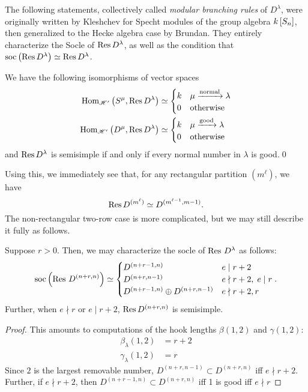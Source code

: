 \documentclass{amsart}
\begin{document}
  The following statements, collectively called \emph{modular branching rules} of $D^\lambda$, were originally written by Kleshchev for Specht modules of the group algebra $k\left[ S_n \right]$, then generalized to the Hecke algebra case by Brundan.\cite{Kleshchev}\cite{Brundan} 
  They entirely characterize the Socle of $\operatorname{Res} D^\lambda$, as well as the condition that $\operatorname{soc}\left( \operatorname{Res} D^\lambda \right) \simeq \operatorname{Res} D^\lambda$.
  \begin{theorem}
    We have the following isomorphisms of vector spaces
    \begin{align*}
      \text{Hom}_{\mathscr{H}'}\left( S^\mu,\operatorname{Res} D^\lambda \right) 
      &\simeq \begin{cases}
        k & \mu \xrightarrow{\text{normal}} \lambda\\
        0 & \text{otherwise}
      \end{cases}\\
      \text{Hom}_{\mathscr{H}'}\left( D^\mu,\operatorname{Res} D^\lambda \right) 
      &\simeq \begin{cases}
        k & \mu \xrightarrow{\text{good}} \lambda\\
        0 & \text{otherwise}
      \end{cases}
    \end{align*}
    and $\operatorname{Res} D^\lambda$ is semisimple if and only if every normal number in $\lambda$ is good.\qed
  \end{theorem}

  Using this, we immediately see that, for any rectangular partition $(m^\ell)$, we have
  \[
    \operatorname{Res} D^{(m^\ell)} \simeq D^{(m^{\ell-1},m-1)}.
  \]
  The non-rectangular two-row case is more complicated, but we may still describe it fully as follows.
  \begin{corollary}\label{D Restrictions}
    Suppose $r > 0$.
    Then, we may characterize the socle of $\operatorname{Res} \, D^\lambda$ as follows:
    \[
      \operatorname{soc}\left( \operatorname{Res} \, D^{(n+r,n)} \right) \simeq \begin{cases}
        D^{(n + r - 1,n)} & e \mid r+2\\
        D^{(n + r,n-1)} & e \nmid r+2, \; e \mid r\\
        D^{(n+r-1,n)} \oplus D^{(n+r,n-1)} & e \nmid r+2,r
      \end{cases}.
    \]
    Further, when $e \nmid r$ or $e \mid r + 2$, $\operatorname{Res} D^{(n+r,n)}$ is semisimple.
  \end{corollary}
  \begin{proof}
    This amounts to computations of the hook lengths $\beta(1,2)$ and $\gamma(1,2)$:
    \begin{align*}
      \beta_\lambda(1,2) &= r + 2\\
      \gamma_\lambda(1,2) &= r
    \end{align*}
    Since $2$ is the largest removable number, $D^{(n+r,n-1)} \subset D^{(n+r,n)}$ iff $e \nmid r + 2$.
    Further, if $e \nmid r + 2$, then $D^{(n+r-1,n)} \subset D^{(n+r,n)}$ iff 1 is good iff $e \nmid r$
  \end{proof}
\end{document}
